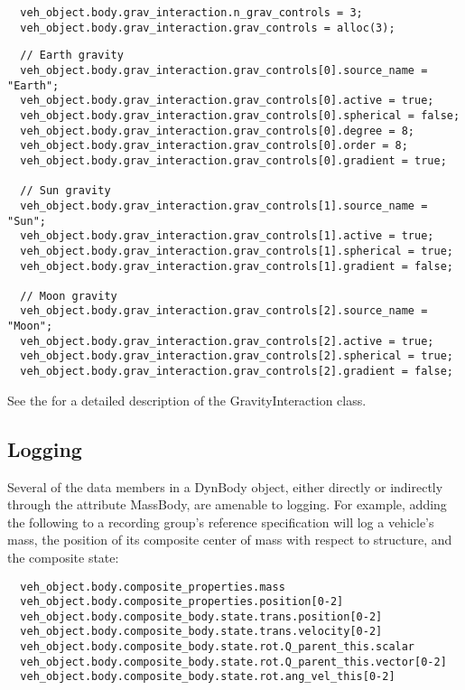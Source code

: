 \begin{verbatim}
  veh_object.body.grav_interaction.n_grav_controls = 3;
  veh_object.body.grav_interaction.grav_controls = alloc(3);
  \end{verbatim}
\clearpage
\begin{verbatim}
  // Earth gravity
  veh_object.body.grav_interaction.grav_controls[0].source_name = "Earth";
  veh_object.body.grav_interaction.grav_controls[0].active = true;
  veh_object.body.grav_interaction.grav_controls[0].spherical = false;
  veh_object.body.grav_interaction.grav_controls[0].degree = 8;
  veh_object.body.grav_interaction.grav_controls[0].order = 8;
  veh_object.body.grav_interaction.grav_controls[0].gradient = true;

  // Sun gravity
  veh_object.body.grav_interaction.grav_controls[1].source_name = "Sun";
  veh_object.body.grav_interaction.grav_controls[1].active = true;
  veh_object.body.grav_interaction.grav_controls[1].spherical = true;
  veh_object.body.grav_interaction.grav_controls[1].gradient = false;

  // Moon gravity
  veh_object.body.grav_interaction.grav_controls[2].source_name = "Moon";
  veh_object.body.grav_interaction.grav_controls[2].active = true;
  veh_object.body.grav_interaction.grav_controls[2].spherical = true;
  veh_object.body.grav_interaction.grav_controls[2].gradient = false;
\end{verbatim}

See the  for a detailed description of the
GravityInteraction class.

\subsection{Logging}
Several of the data members in a DynBody object, either directly or
indirectly through the attribute MassBody, are amenable to logging. For example,
adding the following to a recording group's reference specification
will log a vehicle's mass, the position of its composite center of mass
with respect to structure, and the composite state:

\begin{verbatim}
  veh_object.body.composite_properties.mass
  veh_object.body.composite_properties.position[0-2]
  veh_object.body.composite_body.state.trans.position[0-2]
  veh_object.body.composite_body.state.trans.velocity[0-2]
  veh_object.body.composite_body.state.rot.Q_parent_this.scalar
  veh_object.body.composite_body.state.rot.Q_parent_this.vector[0-2]
  veh_object.body.composite_body.state.rot.ang_vel_this[0-2]
\end{verbatim}

